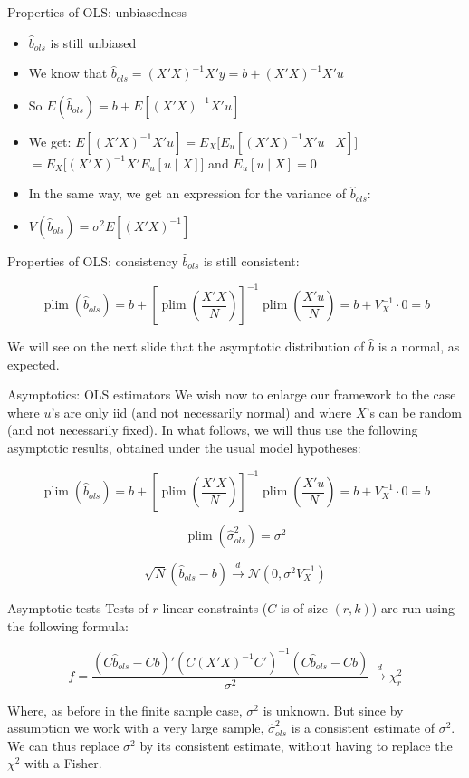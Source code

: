 \documentclass[aspectratio=169]{beamer}
\DeclareMathOperator{\plim}{plim}
\begin{document}
\begin{frame}{Properties of OLS: unbiasedness}
\begin{itemize}
    \item $\hat{b}_{ols}$ is still unbiased
    \item We know that $\hat{b}_{ols} = (X'X)^{-1}X'y = b + (X'X)^{-1}X'u$
    \item So $E(\hat{b}_{ols}) = b + E[(X'X)^{-1}X'u]$
    \item We get: $E[(X'X)^{-1}X'u] = E_X\big[E_u[(X'X)^{-1}X'u \mid X]\big]$\\
    $= E_X\big[(X'X)^{-1}X'E_u[u \mid X]\big]$ and $E_u[u \mid X] = 0$
    \item In the same way, we get an expression for the variance of $\hat{b}_{ols}$:
    \item $V(\hat{b}_{ols}) = \sigma^2E[(X'X)^{-1}]$
\end{itemize}
\end{frame}

\begin{frame}{Properties of OLS: consistency}
$\hat{b}_{ols}$ is still consistent:

\[\plim(\hat{b}_{ols}) = b + \left[\plim\left(\frac{X'X}{N}\right)\right]^{-1}\plim\left(\frac{X'u}{N}\right) = b + V_X^{-1} \cdot 0 = b\]

We will see on the next slide that the asymptotic distribution of $\hat{b}$ is a normal, as expected.
\end{frame}

\begin{frame}{Asymptotics: OLS estimators}
We wish now to enlarge our framework to the case where $u$'s are only iid (and not necessarily normal) and where $X$'s can be random (and not necessarily fixed). In what follows, we will thus use the following asymptotic results, obtained under the usual model hypotheses:

\[\plim(\hat{b}_{ols}) = b + \left[\plim\left(\frac{X'X}{N}\right)\right]^{-1}\plim\left(\frac{X'u}{N}\right) = b + V_X^{-1} \cdot 0 = b\]

\[\plim(\hat{\sigma}_{ols}^2) = \sigma^2\]

\[\sqrt{N}(\hat{b}_{ols} - b) \xrightarrow{d} \mathcal{N}(0, \sigma^2V_X^{-1})\]
\end{frame}

\begin{frame}{Asymptotic tests}
Tests of $r$ linear constraints ($C$ is of size $(r,k)$) are run using the following formula:

\[f = \frac{(C\hat{b}_{ols} - Cb)'(C(X'X)^{-1}C')^{-1}(C\hat{b}_{ols} - Cb)}{\sigma^2} \xrightarrow{d} \chi_r^2\]

Where, as before in the finite sample case, $\sigma^2$ is unknown. But since by assumption we work with a very large sample, $\hat{\sigma}_{ols}^2$ is a consistent estimate of $\sigma^2$. We can thus replace $\sigma^2$ by its consistent estimate, without having to replace the $\chi^2$ with a Fisher.
\end{frame}
\end{document}
